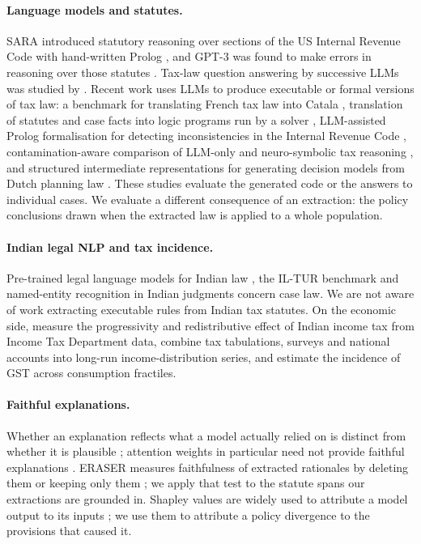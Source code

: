 \documentclass[sn-apa]{sn-jnl}
\begin{document}
\paragraph{Language models and statutes.}
SARA introduced statutory reasoning over sections of the US Internal Revenue
Code with hand-written Prolog \citep{holzenberger2020dataset}, and
GPT-3 was found to make errors in reasoning over those statutes
\citep{blairstanek2023gpt3}. Tax-law question answering by successive LLMs
was studied by \citet{nay2024tax}. Recent work uses LLMs to produce
executable or formal versions of tax law: a benchmark for translating French
tax law into Catala \citep{lorenzo2025translating}, translation of statutes
and case facts into logic programs run by a solver
\citep{jurayj2026logic}, LLM-assisted Prolog formalisation for detecting
inconsistencies in the Internal Revenue Code \citep{yadamsuren2026llm},
contamination-aware comparison of LLM-only and neuro-symbolic tax reasoning
\citep{kordjamshidi2026reasoners}, and structured intermediate
representations for generating decision models from Dutch planning law
\citep{graus2026legal}. These studies evaluate the generated code or the
answers to individual cases. We evaluate a different consequence of an
extraction: the policy conclusions drawn when the extracted law is applied
to a whole population.

\paragraph{Indian legal NLP and tax incidence.}
Pre-trained legal language models for Indian law \citep{paul2023pretrained},
the IL-TUR benchmark \citep{joshi2024iltur} and named-entity recognition in
Indian judgments \citep{kalamkar2022ner} concern case law. We are not aware
of work extracting executable rules from Indian tax statutes. On the
economic side, \citet{datt2022progressivity} measure the progressivity and
redistributive effect of Indian income tax from Income Tax Department data,
\citet{chancel2019indian} combine tax tabulations, surveys and national
accounts into long-run income-distribution series, and
\citet{mukherjee2025gst} estimate the incidence of GST across consumption
fractiles.

\paragraph{Faithful explanations.}
Whether an explanation reflects what a model actually relied on is distinct
from whether it is plausible \citep{jacovi2020faithful}; attention weights
in particular need not provide faithful explanations
\citep{jain2019attention}. ERASER measures faithfulness of extracted
rationales by deleting them or keeping only them
\citep{deyoung2020eraser}; we apply that test to the statute spans our
extractions are grounded in. Shapley values \citep{shapley1953value} are
widely used to attribute a model output to its inputs
\citep{lundberg2017unified}; we use them to attribute a policy divergence to
the provisions that caused it.
\end{document}
